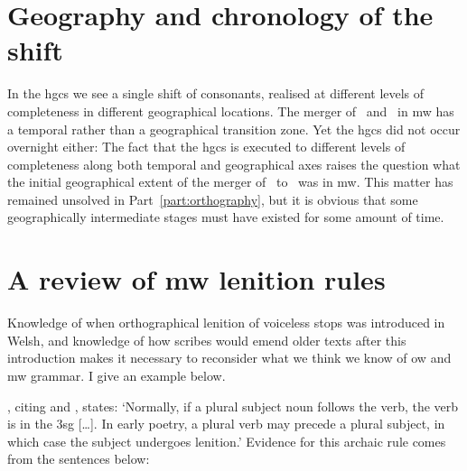 \section{Geography and chronology of the shift}
\label{sec:geogr-chron-shift}

In the \gls{hgcs} we see a single shift of consonants, realised at different levels of completeness in different geographical locations. The merger of \lT\ and \xD\ in \gls{mw} has a temporal rather than a geographical transition zone. Yet the \gls{hgcs} did not occur overnight either:
The fact that the \gls{hgcs} is executed to different levels of completeness along both temporal and geographical axes raises the question what the initial geographical extent of the merger of \lT\ to \xD\ was in \gls{mw}. This matter has remained unsolved in Part~\ref{part:orthography}, but it is obvious that some geographically intermediate stages must have existed for some amount of time.


\section{A review of \gls{mw} lenition rules}
\label{sec:cons-other-ideas}
Knowledge of when orthographical lenition of voiceless stops was introduced in Welsh, and knowledge of how scribes would emend older texts after this introduction makes it necessary to reconsider what we think we know of \gls{ow} and \gls{mw} grammar. I give an example below.

\Textcite[2]{schrijver_free_2010}, citing \textcite[18, 179]{evans_grammar_1964} and \textcite[193n]{morgan_y_1952}, states:
`Normally, if a plural subject noun follows the verb, the verb is in the 3sg [\dots]. In early poetry, a plural verb may precede a plural subject, in which case the subject undergoes lenition.' Evidence for this archaic rule comes from the sentences below:
\begin{mwl}
\end{mwl}

